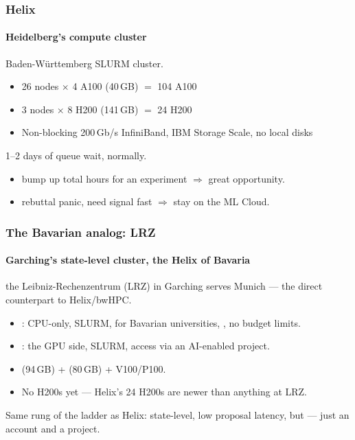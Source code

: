 \documentclass[10pt,aspectratio=169,notheorems]{beamer}
\begin{document}
\begin{frame}
    \frametitle{Helix}
    \framesubtitle{Heidelberg's compute cluster}
     Baden-W\"urttemberg SLURM cluster.
    \begin{itemize}
        \item 26 nodes $\times$ 4 A100 (40\,GB) $=$ 104 A100
        \item 3 nodes $\times$ 8 H200 (141\,GB) $=$ 24 H200
        \item Non-blocking 200\,Gb/s InfiniBand, IBM Storage Scale, no local disks
    \end{itemize}

    \vspace{0.5em}
     1--2 days of queue wait, normally.

    \vspace{0.5em}
    \begin{itemize}
        \item bump up total hours for an experiment $\Rightarrow$ great opportunity.
        \item rebuttal panic, need signal fast $\Rightarrow$ stay on the ML Cloud.
    \end{itemize}

\end{frame}

\begin{frame}
    \frametitle{The Bavarian analog: LRZ}
    \framesubtitle{Garching's state-level cluster, the Helix of Bavaria}
     the Leibniz-Rechenzentrum (LRZ) in Garching serves Munich  --- the direct counterpart to Helix/bwHPC.

    \vspace{0.5em}
    \begin{itemize}
        \item {}: CPU-only, SLURM,  for Bavarian universities, , no budget limits.
        \item {}: the GPU side, SLURM, access  via an AI-enabled project.
    \end{itemize}

    \vspace{0.5em}
    \begin{itemize}
        \item {} (94\,GB) +  (80\,GB) + V100/P100.
        \item No H200s yet --- Helix's 24 H200s are newer than anything at LRZ.
    \end{itemize}

    \vspace{1em}
    \textcolor{SlidemintMuted}{Same rung of the ladder as Helix: state-level, low proposal latency, but  --- just an account and a project.}
\end{frame}
\end{document}
